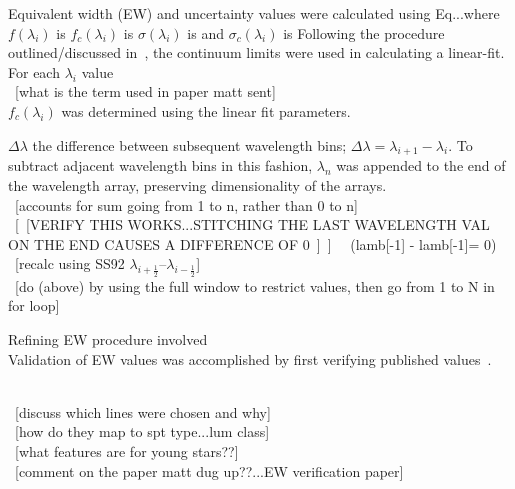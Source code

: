 Equivalent width (EW) and uncertainty values were calculated using Eq...where $f(\lambda_{i})$ is
$f_{c}(\lambda_{i})$ is
$\sigma(\lambda_{i})$ is
and $\sigma_{c}(\lambda_{i})$ is
Following the procedure outlined/discussed in~\cite{Cushing_2005}, the continuum limits were used in calculating a linear-fit.  For each $\lambda_{i}$ value\\
~[what is the term used in paper matt sent]\\
$f_{c}(\lambda_{i})$ was determined using the linear fit parameters.


$\Delta\lambda$ the difference between subsequent wavelength bins; $\Delta\lambda = \lambda_{i+1} - \lambda_{i}$.  To subtract adjacent wavelength bins in this fashion, $\lambda_{n}$ was appended to the end of the wavelength array, preserving dimensionality of the arrays.\\
~[accounts for sum going from 1 to n, rather than 0 to n]\\
~[~[VERIFY THIS WORKS...STITCHING THE LAST WAVELENGTH VAL ON THE END CAUSES A DIFFERENCE OF 0~]~] ~~(lamb[-1] - lamb[-1]= 0)\\

~[recalc using SS92 $\lambda_{i+\frac{1}{2}}$--$\lambda_{i-\frac{1}{2}}$]\\
~[do (above) by using the full window to restrict values, then go from 1 to N in for loop]


Refining EW procedure involved \\
Validation of EW values was accomplished by first verifying published values~\cite{Rayner_2009}.  

~\\~[discuss which lines were chosen and why]\\
~[how do they map to spt type...lum class]\\
~[what features are for young stars??]\\
~[comment on the paper matt dug up??...EW verification paper]


